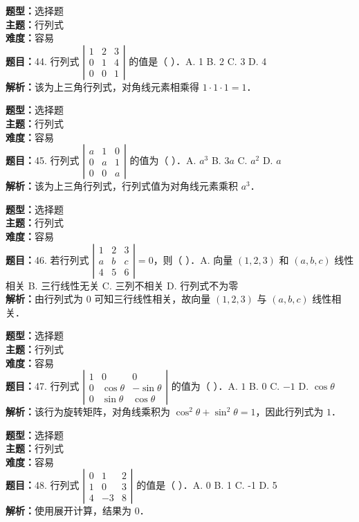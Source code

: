 \documentclass{ctexart}
\newenvironment{question}[5]{%
	\noindent\textbf{题型：}#1\\
	\textbf{主题：}#2\\
	\textbf{难度：}#3\\
	\textbf{题目：}#4\\
	\textbf{解析：}#5\\
	\vspace{1em}
}{}
\begin{document}
\begin{question}
	{选择题}
	{行列式}
	{容易}
	{44. 行列式 $\left|\begin{array}{ccc}1 & 2 & 3 \\ 0 & 1 & 4 \\ 0 & 0 & 1\end{array}\right|$ 的值是（ ）．A. 1 B. 2 C. 3 D. 4}
	{该为上三角行列式，对角线元素相乘得 $1 \cdot 1 \cdot 1 = 1$．}
\end{question}

\begin{question}
	{选择题}
	{行列式}
	{容易}
	{45. 行列式 $\left|\begin{array}{ccc}a & 1 & 0 \\ 0 & a & 1 \\ 0 & 0 & a\end{array}\right|$ 的值为（ ）．A. $a^3$ B. $3a$ C. $a^2$ D. $a$}
	{该为上三角行列式，行列式值为对角线元素乘积 $a^3$．}
\end{question}

\begin{question}
	{选择题}
	{行列式}
	{容易}
	{46. 若行列式 $\left|\begin{array}{ccc}1 & 2 & 3 \\ a & b & c \\ 4 & 5 & 6\end{array}\right|=0$，则（ ）．A. 向量 $(1,2,3)$ 和 $(a,b,c)$ 线性相关 B. 三行线性无关 C. 三列不相关 D. 行列式不为零}
	{由行列式为 0 可知三行线性相关，故向量 $(1,2,3)$ 与 $(a,b,c)$ 线性相关．}
\end{question}

\begin{question}
	{选择题}
	{行列式}
	{容易}
	{47. 行列式 $\left|\begin{array}{ccc}1 & 0 & 0 \\ 0 & \cos\theta & -\sin\theta \\ 0 & \sin\theta & \cos\theta\end{array}\right|$ 的值为（ ）．A. $1$ B. $0$ C. $-1$ D. $\cos\theta$}
	{该行为旋转矩阵，对角线乘积为 $\cos^2\theta + \sin^2\theta = 1$，因此行列式为 $1$．}
\end{question}

\begin{question}
	{选择题}
	{行列式}
	{容易}
	{48. 行列式 $\left|\begin{array}{ccc}0 & 1 & 2 \\ 1 & 0 & 3 \\ 4 & -3 & 8\end{array}\right|$ 的值是（ ）．A. 0 B. 1 C. -1 D. 5}
	{使用展开计算，结果为 0．}
\end{question}
\end{document}
